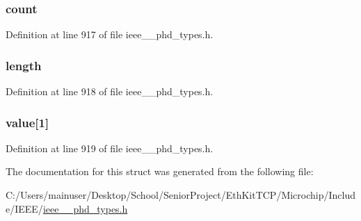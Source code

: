 \subsubsection[{count}]{ count}\label{struct___observation_scan_fixed_list_abf6db060ae8e224764b0f867fb135ecd}


Definition at line 917 of file ieee\+\_\+\_\+phd\+\_\+types.\+h.

\hypertarget{struct___observation_scan_fixed_list_a3743679e4ff85e3e1b3fc2e59973fbb3}{}
\subsubsection[{length}]{ length}\label{struct___observation_scan_fixed_list_a3743679e4ff85e3e1b3fc2e59973fbb3}


Definition at line 918 of file ieee\+\_\+\_\+phd\+\_\+types.\+h.

\hypertarget{struct___observation_scan_fixed_list_a3d8d9735ae9b467e18886ad0ef60cd6f}{}
\subsubsection[{value}]{ value\mbox{[}1\mbox{]}}\label{struct___observation_scan_fixed_list_a3d8d9735ae9b467e18886ad0ef60cd6f}


Definition at line 919 of file ieee\+\_\+\_\+phd\+\_\+types.\+h.



The documentation for this struct was generated from the following file\+:\begin{DoxyCompactItemize}
\item 
C\+:/\+Users/mainuser/\+Desktop/\+School/\+Senior\+Project/\+Eth\+Kit\+T\+C\+P/\+Microchip/\+Include/\+I\+E\+E\+E/\hyperlink{ieee__11073__phd__types_8h}{ieee\+\_\+\_\+phd\+\_\+types.\+h}\end{DoxyCompactItemize}

